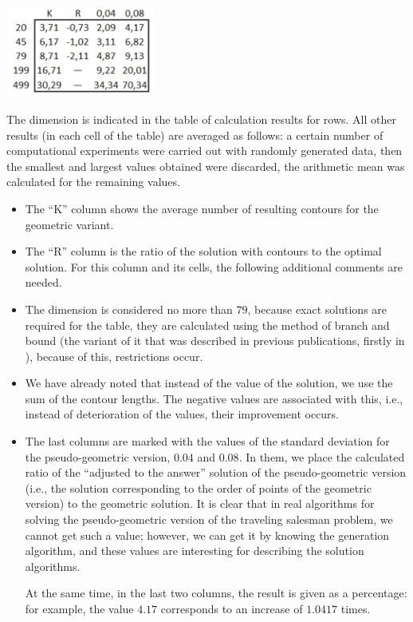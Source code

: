 \documentclass[12pt]{llncs}
\begin{document}
\includegraphics[height=3cm]{poso-04.png}

The dimension 
is indicated in the table of calculation results for rows. 
All other results (in each cell of the table) 
are averaged as follows: 
a certain number of computational experiments 
were carried out with randomly generated data,
then the smallest and largest values obtained were discarded, 
the arithmetic mean was calculated for the remaining values. 


\begin{itemize}
\item 
The ``K'' column 
shows the average number of resulting contours 
for the geometric variant.
\item 
The ``R'' column is the ratio of the solution
with contours to the optimal solution.
For this column and its cells, 
the following additional comments are needed.
\item The dimension is considered no more than $79$, 
because exact solutions are required for the table, 
they are calculated using the method of branch and bound 
(the variant of it that was described in previous publications,
firstly in \cite{KIO-2021}),
because of this, restrictions occur.
\item We have already noted 
that instead of the value of the solution, 
we use the sum of the contour lengths.
The negative values are associated with this, 
i.e., instead of deterioration of the values, 
their improvement occurs.
\item 
The last columns are marked with the values 
of the standard deviation for the pseudo-geometric version,
$0.04$ and $0.08$. 
In them, we place the calculated ratio 
of the ``adjusted to the answer'' solution
of the pseudo-geometric version 
(i.e., the solution corresponding to the order of points 
of the geometric version) 
to the geometric solution. 
It is clear that in real algorithms 
for solving the pseudo-geometric version 
of the traveling salesman problem, 
we cannot get such a value; 
however, we can get it by knowing the generation algorithm, 
and these values are interesting 
for describing the solution algorithms.
\par
At the same time, in the last two columns, 
the result is given as a percentage: 
for example, the value $4.17$
corresponds to an increase of $1.0417$ times.
\end{itemize}
\end{document}
